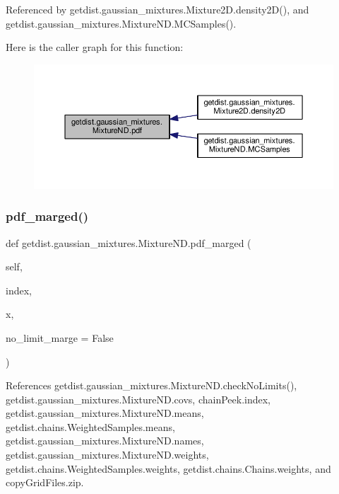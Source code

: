 Referenced by getdist.\+gaussian\+\_\+mixtures.\+Mixture2\+D.\+density2\+D(), and getdist.\+gaussian\+\_\+mixtures.\+Mixture\+N\+D.\+M\+C\+Samples().

Here is the caller graph for this function\+:
\nopagebreak
\begin{figure}[H]
\begin{center}
\leavevmode
\includegraphics[width=350pt]{classgetdist_1_1gaussian__mixtures_1_1MixtureND_af0a646f4166c5e7183084e5fbea8b0b9_icgraph}
\end{center}
\end{figure}
\mbox{\label{classgetdist_1_1gaussian__mixtures_1_1MixtureND_aa2ffcc1eb16586e772ea92dd662ba9e7}} 
\subsubsection{\texorpdfstring{pdf\+\_\+marged()}{pdf\_marged()}}
{\footnotesize\ttfamily def getdist.\+gaussian\+\_\+mixtures.\+Mixture\+N\+D.\+pdf\+\_\+marged (\begin{DoxyParamCaption}\item[{}]{self,  }\item[{}]{index,  }\item[{}]{x,  }\item[{}]{no\+\_\+limit\+\_\+marge = {\ttfamily False} }\end{DoxyParamCaption})}



References getdist.\+gaussian\+\_\+mixtures.\+Mixture\+N\+D.\+check\+No\+Limits(), getdist.\+gaussian\+\_\+mixtures.\+Mixture\+N\+D.\+covs, chain\+Peek.\+index, getdist.\+gaussian\+\_\+mixtures.\+Mixture\+N\+D.\+means, getdist.\+chains.\+Weighted\+Samples.\+means, getdist.\+gaussian\+\_\+mixtures.\+Mixture\+N\+D.\+names, getdist.\+gaussian\+\_\+mixtures.\+Mixture\+N\+D.\+weights, getdist.\+chains.\+Weighted\+Samples.\+weights, getdist.\+chains.\+Chains.\+weights, and copy\+Grid\+Files.\+zip.




